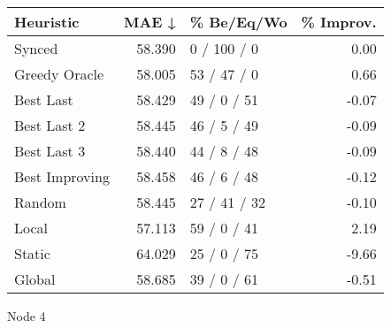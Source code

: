 \begin{tabular}{lrlr}
\toprule
\textbf{Heuristic} & \textbf{MAE ↓} & \textbf{\% Be/Eq/Wo} & \textbf{\% Improv.} \\
\midrule
            Synced &         58.390 &          0 / 100 / 0 &                0.00 \\
     Greedy Oracle &         58.005 &          53 / 47 / 0 &                0.66 \\
         Best Last &         58.429 &          49 / 0 / 51 &               -0.07 \\
       Best Last 2 &         58.445 &          46 / 5 / 49 &               -0.09 \\
       Best Last 3 &         58.440 &          44 / 8 / 48 &               -0.09 \\
    Best Improving &         58.458 &          46 / 6 / 48 &               -0.12 \\
            Random &         58.445 &         27 / 41 / 32 &               -0.10 \\
             Local &         57.113 &          59 / 0 / 41 &                2.19 \\
            Static &         64.029 &          25 / 0 / 75 &               -9.66 \\
            Global &         58.685 &          39 / 0 / 61 &               -0.51 \\
\bottomrule
\end{tabular}
\caption{Node 4}
\label{tab:iid_lr01_le2_bs2_4}
